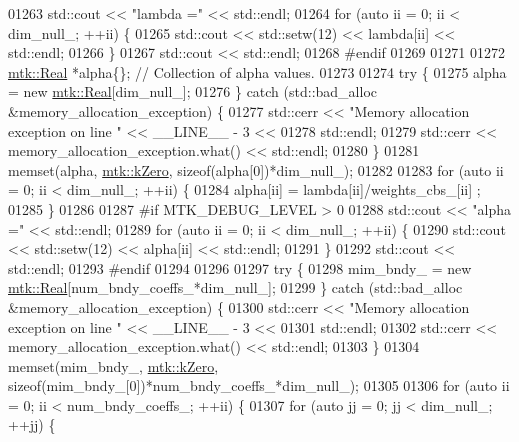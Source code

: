 \begin{DoxyCode}
{{01263   std::cout << \textcolor{stringliteral}{"lambda ="} << std::endl;
01264   \textcolor{keywordflow}{for} (\textcolor{keyword}{auto} ii = 0; ii < dim\_null\_; ++ii) \{
01265     std::cout << std::setw(12) << lambda[ii] << std::endl;
01266   \}
01267   std::cout << std::endl;
01268 \textcolor{preprocessor}{  #endif}
01269 
01271 
01272   \hyperlink{group__c01-roots_gac080bbbf5cbb5502c9f00405f894857d}{mtk::Real} *alpha\{\}; \textcolor{comment}{// Collection of alpha values.}
01273 
01274   \textcolor{keywordflow}{try} \{
01275     alpha = \textcolor{keyword}{new} \hyperlink{group__c01-roots_gac080bbbf5cbb5502c9f00405f894857d}{mtk::Real}[dim\_null\_];
01276   \} \textcolor{keywordflow}{catch} (std::bad\_alloc &memory\_allocation\_exception) \{
01277     std::cerr << \textcolor{stringliteral}{"Memory allocation exception on line "} << \_\_LINE\_\_ - 3 <<
01278       std::endl;
01279     std::cerr << memory\_allocation\_exception.what() << std::endl;
01280   \}
01281   memset(alpha, \hyperlink{group__c01-roots_ga59a451a5fae30d59649bcda274fea271}{mtk::kZero}, \textcolor{keyword}{sizeof}(alpha[0])*dim\_null\_);
01282 
01283   \textcolor{keywordflow}{for} (\textcolor{keyword}{auto} ii = 0; ii < dim\_null\_; ++ii) \{
01284     alpha[ii] = lambda[ii]/weights\_cbs\_[ii] ;
01285   \}
01286 
01287 \textcolor{preprocessor}{  #if MTK\_DEBUG\_LEVEL > 0}
01288   std::cout << \textcolor{stringliteral}{"alpha ="} << std::endl;
01289   \textcolor{keywordflow}{for} (\textcolor{keyword}{auto} ii = 0; ii < dim\_null\_; ++ii) \{
01290     std::cout << std::setw(12) << alpha[ii] << std::endl;
01291   \}
01292   std::cout << std::endl;
01293 \textcolor{preprocessor}{  #endif}
01294 
01296 
01297   \textcolor{keywordflow}{try} \{
01298     mim\_bndy\_ = \textcolor{keyword}{new} \hyperlink{group__c01-roots_gac080bbbf5cbb5502c9f00405f894857d}{mtk::Real}[num\_bndy\_coeffs\_*dim\_null\_];
01299   \} \textcolor{keywordflow}{catch} (std::bad\_alloc &memory\_allocation\_exception) \{
01300     std::cerr << \textcolor{stringliteral}{"Memory allocation exception on line "} << \_\_LINE\_\_ - 3 <<
01301       std::endl;
01302     std::cerr << memory\_allocation\_exception.what() << std::endl;
01303   \}
01304   memset(mim\_bndy\_, \hyperlink{group__c01-roots_ga59a451a5fae30d59649bcda274fea271}{mtk::kZero}, \textcolor{keyword}{sizeof}(mim\_bndy\_[0])*num\_bndy\_coeffs\_*dim\_null\_);
01305 
01306   \textcolor{keywordflow}{for} (\textcolor{keyword}{auto} ii = 0; ii < num\_bndy\_coeffs\_; ++ii) \{
01307     \textcolor{keywordflow}{for} (\textcolor{keyword}{auto} jj = 0; jj < dim\_null\_; ++jj) \{
}}
\end{DoxyCode}
